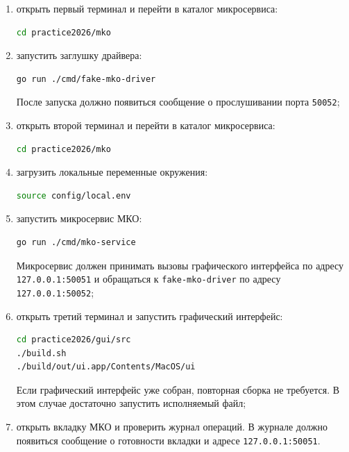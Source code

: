 \begin{enumerate}
	\item открыть первый терминал и перейти в каталог микросервиса:
\begin{lstlisting}[language=bash]
cd practice2026/mko
\end{lstlisting}

	\item запустить заглушку драйвера:
\begin{lstlisting}[language=bash]
go run ./cmd/fake-mko-driver
\end{lstlisting}

	После запуска должно появиться сообщение о прослушивании порта \texttt{50052};

	\item открыть второй терминал и перейти в каталог микросервиса:
\begin{lstlisting}[language=bash]
cd practice2026/mko
\end{lstlisting}

	\item загрузить локальные переменные окружения:
\begin{lstlisting}[language=bash]
source config/local.env
\end{lstlisting}

	\item запустить микросервис МКО:
\begin{lstlisting}[language=bash]
go run ./cmd/mko-service
\end{lstlisting}

	Микросервис должен принимать вызовы графического интерфейса по адресу \texttt{127.0.0.1:50051} и обращаться к \texttt{fake-mko-driver} по адресу \texttt{127.0.0.1:50052};

	\item открыть третий терминал и запустить графический интерфейс:
\begin{lstlisting}[language=bash]
cd practice2026/gui/src
./build.sh
./build/out/ui.app/Contents/MacOS/ui
\end{lstlisting}

	Если графический интерфейс уже собран, повторная сборка не требуется. В этом случае достаточно запустить исполняемый файл;

	\item открыть вкладку МКО и проверить журнал операций. В журнале должно появиться сообщение о готовности вкладки и адресе \texttt{127.0.0.1:50051}.
\end{enumerate}

